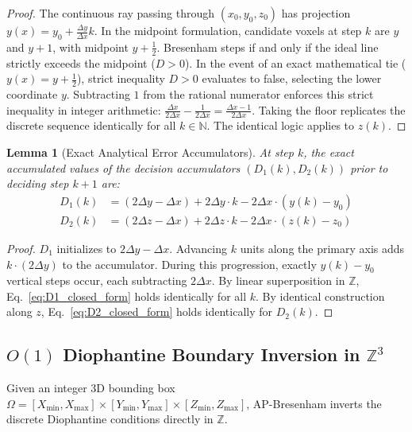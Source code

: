 \documentclass[journal=dme,manuscript=article,11pt]{article}
\newtheorem{lemma}{Lemma}
\begin{document}
\begin{proof}
The continuous ray passing through $(x_0, y_0, z_0)$ has projection $y(x) = y_0 + \frac{\Delta y}{\Delta x}k$. In the midpoint formulation, candidate voxels at step $k$ are $y$ and $y+1$, with midpoint $y + \frac{1}{2}$. Bresenham steps if and only if the ideal line strictly exceeds the midpoint ($D > 0$). In the event of an exact mathematical tie ($y(x) = y + \frac{1}{2}$), strict inequality $D > 0$ evaluates to false, selecting the lower coordinate $y$. Subtracting $1$ from the rational numerator enforces this strict inequality in integer arithmetic: $\frac{\Delta x}{2\Delta x} - \frac{1}{2\Delta x} = \frac{\Delta x - 1}{2\Delta x}$. Taking the floor replicates the discrete sequence identically for all $k \in \mathbb{N}$. The identical logic applies to $z(k)$.
\end{proof}

\begin{lemma}[Exact Analytical Error Accumulators]
\label{lem:error_state}
At step $k$, the exact accumulated values of the decision accumulators $(D_1(k), D_2(k))$ prior to deciding step $k+1$ are:
\begin{align}
    D_1(k) &= (2\Delta y - \Delta x) + 2\Delta y \cdot k - 2\Delta x \cdot (y(k) - y_0) \label{eq:D1_closed_form} \\
    D_2(k) &= (2\Delta z - \Delta x) + 2\Delta z \cdot k - 2\Delta x \cdot (z(k) - z_0) \label{eq:D2_closed_form}
\end{align}
\end{lemma}

\begin{proof}
$D_1$ initializes to $2\Delta y - \Delta x$. Advancing $k$ units along the primary axis adds $k \cdot (2\Delta y)$ to the accumulator. During this progression, exactly $y(k) - y_0$ vertical steps occur, each subtracting $2\Delta x$. By linear superposition in $\mathbb{Z}$, Eq.~\eqref{eq:D1_closed_form} holds identically for all $k$. By identical construction along $z$, Eq.~\eqref{eq:D2_closed_form} holds identically for $D_2(k)$.
\end{proof}

\subsection{$O(1)$ Diophantine Boundary Inversion in $\mathbb{Z}^3$}
Given an integer 3D bounding box $\Omega = [X_{\min}, X_{\max}] \times [Y_{\min}, Y_{\max}] \times [Z_{\min}, Z_{\max}]$, AP-Bresenham inverts the discrete Diophantine conditions directly in $\mathbb{Z}$.
\end{document}
